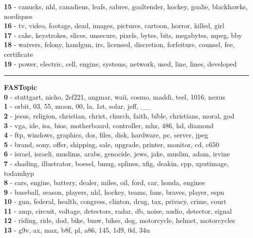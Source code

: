 \textbf{15} - canucks, nhl, canadiens, leafs, sabres, goaltender, hockey, goalie, blackhawks, nordiques\\
\textbf{16} - tv, video, footage, dead, images, pictures, cartoon, horror, killed, girl\\
\textbf{17} - cake, keystrokes, slices, unsecure, pixels, bytes, bits, megabytes, mpeg, bby\\
\textbf{18} - waivers, felony, handgun, irs, licensed, discretion, forfeiture, counsel, fee, certificate\\
\textbf{19} - power, electric, cell, engine, systems, network, used, line, lines, developed\\
\hrule\vspace{2mm}
\noindent
\textbf{FASTopic}\vspace{2mm}\\
\vspace{2mm}
\noindent
\textbf{0} - stuttgart, nicho, 2ef221, angmar, waii, cosmo, maddi, teel, 1016, nexus\\
\textbf{1} - orbit, 03, 55, moon, 00, la, 1st, solar, jeff, \_\_\\
\textbf{2} - jesus, religion, christian, christ, church, faith, bible, christians, moral, god\\
\textbf{3} - vga, ide, isa, bios, motherboard, controller, mhz, 486, hd, diamond\\
\textbf{4} - ftp, windows, graphics, dos, files, disk, hardware, pc, server, jpeg\\
\textbf{5} - brand, sony, offer, shipping, sale, upgrade, printer, monitor, cd, c650\\
\textbf{6} - israel, israeli, muslims, arabs, genocide, jews, jake, muslim, adam, irvine\\
\textbf{7} - shading, illustrator, boesel, bmug, splines, xfig, deakin, cpp, xputimage, todamhyp\\
\textbf{8} - cars, engine, battery, dealer, miles, oil, ford, car, honda, engines\\
\textbf{9} - baseball, season, players, nhl, hockey, teams, fans, braves, player, espn\\
\textbf{10} - gun, federal, health, congress, clinton, drug, tax, privacy, crime, court\\
\textbf{11} - amp, circuit, voltage, detectors, radar, db, noise, audio, detector, signal\\
\textbf{12} - riding, ride, dod, bike, bmw, bikes, dog, motorcycle, helmet, motorcycles\\
\textbf{13} - g9v, ax, max, b8f, pl, a86, 145, 1d9, 0d, 34u\\
